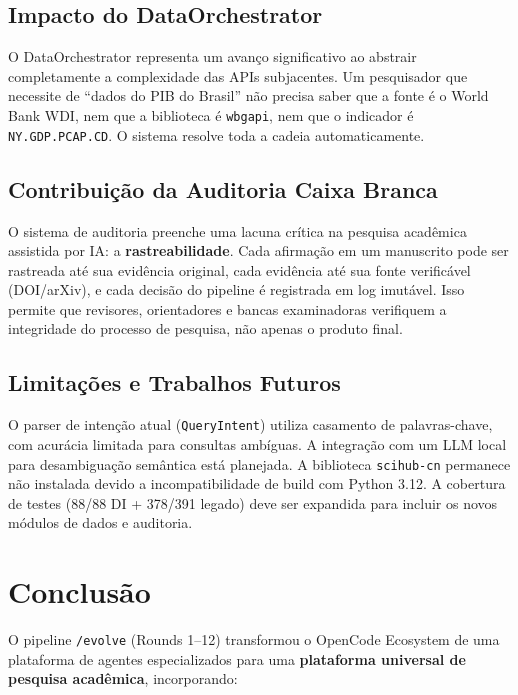 \documentclass[12pt,a4paper]{article}
\begin{document}
\subsection{Impacto do DataOrchestrator}

O DataOrchestrator representa um avanço significativo ao abstrair completamente a complexidade das APIs subjacentes. Um pesquisador que necessite de ``dados do PIB do Brasil'' não precisa saber que a fonte é o World Bank WDI, nem que a biblioteca é \texttt{wbgapi}, nem que o indicador é \texttt{NY.GDP.PCAP.CD}. O sistema resolve toda a cadeia automaticamente.

\subsection{Contribuição da Auditoria Caixa Branca}

O sistema de auditoria preenche uma lacuna crítica na pesquisa acadêmica assistida por IA: a \textbf{rastreabilidade}. Cada afirmação em um manuscrito pode ser rastreada até sua evidência original, cada evidência até sua fonte verificável (DOI/arXiv), e cada decisão do pipeline é registrada em log imutável. Isso permite que revisores, orientadores e bancas examinadoras verifiquem a integridade do processo de pesquisa, não apenas o produto final.

\subsection{Limitações e Trabalhos Futuros}

O parser de intenção atual (\texttt{QueryIntent}) utiliza casamento de palavras-chave, com acurácia limitada para consultas ambíguas. A integração com um LLM local para desambiguação semântica está planejada. A biblioteca \texttt{scihub-cn} permanece não instalada devido a incompatibilidade de build com Python 3.12. A cobertura de testes (88/88 DI + 378/391 legado) deve ser expandida para incluir os novos módulos de dados e auditoria.

\section{Conclusão}

O pipeline \texttt{/evolve} (Rounds 1--12) transformou o OpenCode Ecosystem de uma plataforma de agentes especializados para uma \textbf{plataforma universal de pesquisa acadêmica}, incorporando:
\end{document}
